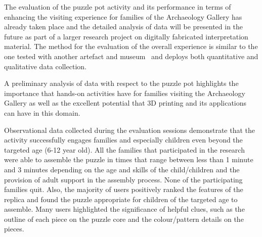 \documentclass[acmlarge,screen,dvipsnames]{acmart}
\begin{document}
%
%
The evaluation of the puzzle pot activity 
and its performance in terms of enhancing the visiting experience for families 
of the Archaeology Gallery has already taken place and the detailed analysis 
of data will be presented in the future as part of a larger research project 
on digitally fabricated interpretation material. The method for the evaluation 
of the overall experience is similar to the one tested with another artefact 
and museum~\cite{Samaroudi2017,10.1007/978-3-030-23089-0_7} and deploys both 
quantitative and qualitative data collection.


A preliminary analysis of data with respect to the puzzle 
pot highlights the importance that hands-on activities have for families 
visiting the Archaeology Gallery as well as the excellent potential 
that 3D printing and its applications can have in this domain. 

Observational data collected during the evaluation sessions
demonstrate that the activity successfully engages families and
especially children even beyond the targeted age (6-12 year old). All
the families that participated in the research were able to assemble
the puzzle in times that range between less than 1 minute and 3 minutes
depending on the age and skills of the child/children and the
provision of adult support in the assembly process. None of the
participating families quit. Also, the majority of users positively
ranked the features of the replica and found the puzzle appropriate
for children of the targeted age to assemble. Many users highlighted
the significance of helpful clues, such as the outline of each piece
on the puzzle core and the colour/pattern details on the pieces. 
\end{document}
